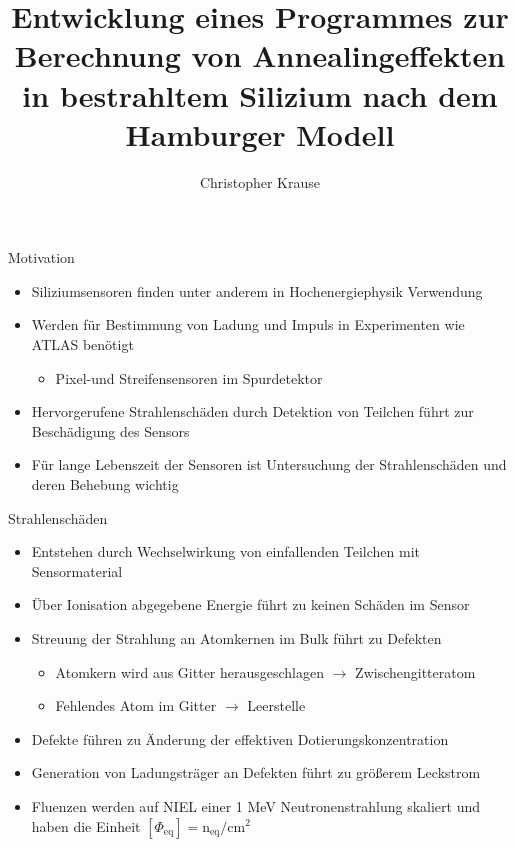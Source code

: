 \documentclass[aspectratio=43, 10pt]{beamer}
\title{Entwicklung eines Programmes zur Berechnung von Annealingeffekten in bestrahltem Silizium nach dem Hamburger Modell}
\author[C.~Krause]{Christopher Krause}
\institute[E4]{Experimentelle Physik IV \\ Fakultät Physik}
\begin{document}
\maketitle




\begin{frame}{Motivation}
  \begin{itemize}
    \item Siliziumsensoren finden unter anderem in Hochenergiephysik Verwendung
    \medskip
    \item Werden für Bestimmung von Ladung und Impuls in Experimenten wie ATLAS benötigt
      \begin{itemize}
        \item Pixel-und Streifensensoren im Spurdetektor
      \end{itemize}
    \medskip
    \item Hervorgerufene Strahlenschäden durch Detektion von Teilchen führt zur Beschädigung des Sensors

    \medskip
    \item Für lange Lebenszeit der Sensoren ist Untersuchung der Strahlenschäden und
          deren Behebung wichtig
  \end{itemize}
\end{frame}



\begin{frame}{Strahlenschäden}
  \begin{itemize}
    \item Entstehen durch Wechselwirkung von einfallenden Teilchen mit Sensormaterial
    \medskip
    \item Über Ionisation abgegebene Energie führt zu keinen Schäden im Sensor
    \medskip
    \item Streuung der Strahlung an Atomkernen im Bulk führt zu Defekten
      \begin{itemize}
        \item Atomkern wird aus Gitter herausgeschlagen $\rightarrow$ Zwischengitteratom
        \item Fehlendes Atom im Gitter $\rightarrow$ Leerstelle
      \end{itemize}
    \medskip
    \item Defekte führen zu Änderung der effektiven Dotierungskonzentration
    \medskip
    \item Generation von Ladungsträger an Defekten führt zu größerem Leckstrom
    \medskip
    \item Fluenzen werden auf NIEL einer 1 MeV Neutronenstrahlung skaliert und haben die Einheit $ [\Phi_{\mathrm{eq}}] = \mathrm{n_{\mathrm{eq}} /cm^2}$
  \end{itemize}
\end{frame}
\end{document}
